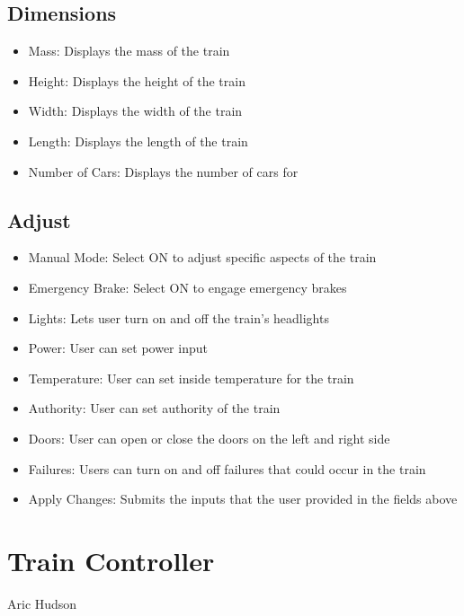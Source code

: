 \documentclass{scrreprt}
\begin{document}
\section{Dimensions}
\begin{itemize}
    \item Mass: Displays the mass of the train
    \item Height: Displays the height of the train
    \item Width: Displays the width of the train
    \item Length: Displays the length of the train
    \item Number of Cars: Displays the number of cars for
\end{itemize}

\section{Adjust}

\begin{itemize}
    \item Manual Mode: Select ON to adjust specific aspects of the train
    \item Emergency Brake: Select ON to engage emergency brakes
    \item Lights: Lets user turn on and off the train's headlights
    \item Power: User can set power input
    \item Temperature: User can set inside temperature for the train
    \item Authority: User can set authority of the train
    \item Doors: User can open or close the doors on the left and right side
    \item Failures: Users can turn on and off failures that could occur in the train
    \item Apply Changes: Submits the inputs that the user provided in the fields above
    \end{itemize}


\chapter{Train Controller}
\Large{Aric Hudson}\\



\end{document}
